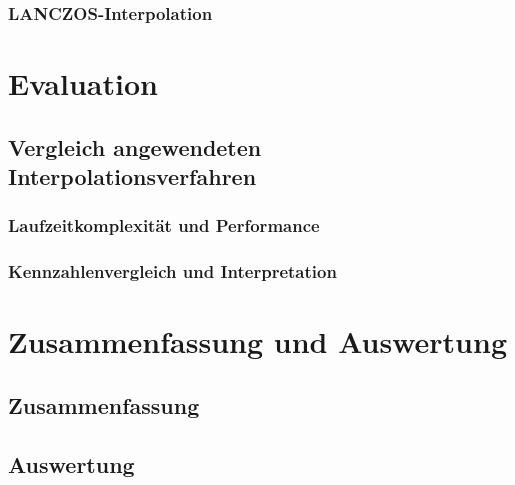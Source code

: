\documentclass[
fontsize=10pt, 
listof = totoc,
parskip = half	
]{report}
\begin{document}
\subsection{LANCZOS-Interpolation}

\chapter{Evaluation}
\label{ch:Evaluation}

\section{Vergleich angewendeten Interpolationsverfahren}

\subsection{Laufzeitkomplexität und Performance}

\subsection{Kennzahlenvergleich und Interpretation}

\chapter{Zusammenfassung und Auswertung}

\section{Zusammenfassung}

\section{Auswertung}




\end{document}

